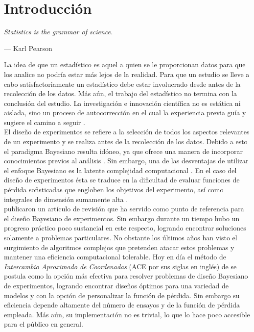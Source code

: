 \chapter{Introducción} \label{chapter:intro}


\epigraph{\textit{Statistics is the grammar of science.}}{--- Karl Pearson}


La idea de que un estadístico es aquel a quien se le proporcionan datos para que los analice no podría estar más lejos de la realidad. Para que un estudio se lleve a cabo satisfactoriamente un estadístico debe estar involucrado desde antes de la recolección de los datos. Más aún, el trabajo del estadístico no termina con la conclusión del estudio. La investigación e innovación científica no es estática ni aislada, sino un proceso de autocorrección en el cual la experiencia previa guía y sugiere el camino a seguir \citep{box_liu_helicopter}. \\


El diseño de experimentos se refiere a la selección de todos los aspectos relevantes de un experimento y se realiza antes de la recolección de los datos. Debido a esto el paradigma Bayesiano resulta idóneo, ya que ofrece una manera de incorporar conocimientos previos al análisis \citep{bernardo_smith,notas_bayes_egp,notas_bayes}. Sin embargo, una de las desventajas de utilizar el enfoque Bayesiano es la latente complejidad computacional \citep{casella_george,geman_y_geman}. En el caso del diseño de experimentos ésta se traduce en la dificultad de evaluar funciones de pérdida sofisticadas que engloben los objetivos del experimento, así como integrales de dimensión sumamente alta \citep{Woods_etal}. \\


\cite{chaloner_verdinelli_doe} publicaron un artículo de revisión que ha servido como punto de referencia para el diseño Bayesiano de experimentos. Sin embargo durante un tiempo hubo un progreso práctico poco sustancial en este respecto, logrando encontrar soluciones solamente a problemas particulares. No obstante los últimos años han visto el surgimiento de algoritmos complejos que pretenden atacar estos problemas y mantener una eficiencia computacional tolerable. Hoy en día el método de \textit{Intercambio Aproximado de Coordenadas} (ACE por sus siglas en inglés) de \cite{Woods_ACE} se postula como la opción más efectiva para resolver problemas de diseño Bayesiano de experimentos, logrando encontrar diseños óptimos para una variedad de modelos y con la opción de personalizar la función de pérdida. Sin embargo su eficiencia depende altamente del número de ensayos y de la función de pérdida empleada. Más aún, su implementación no es trivial, lo que lo hace poco accesible para el público en general. \\ 




